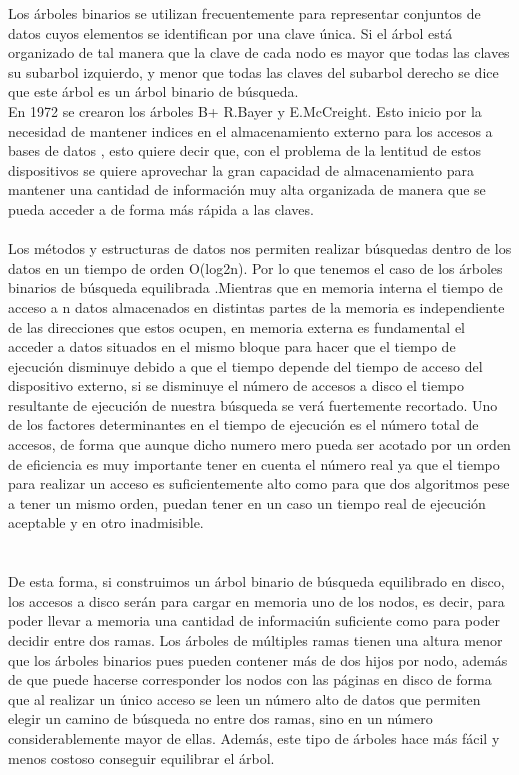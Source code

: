 \documentclass[11pt,a4paper]{report}
\begin{document}
Los \'arboles binarios se utilizan frecuentemente para representar conjuntos de datos cuyos elementos se identifican por una clave \'unica. Si el \'arbol est\'a organizado de tal manera que la clave de cada nodo es mayor que todas las claves su subarbol izquierdo, y menor que todas las claves del subarbol derecho se dice que este \'arbol es un \'arbol binario de b\'usqueda.
\\

En 1972 se crearon los \'arboles B+ R.Bayer y E.McCreight.  Esto inicio por la necesidad de mantener indices en el almacenamiento externo para los accesos a bases de datos , esto quiere decir que, con el  problema de la lentitud  de estos dispositivos se quiere aprovechar la gran capacidad de almacenamiento para mantener una cantidad de informaci\'on muy alta organizada de manera que se pueda acceder a de forma m\'as r\'apida a las claves.
\\
\\
Los m\'etodos y estructuras de datos nos permiten realizar b\'usquedas dentro de los datos en un tiempo de orden O(log2n). Por lo que  tenemos el caso de los \'arboles binarios de b\'usqueda equilibrada .Mientras que en memoria interna el tiempo de acceso a n datos almacenados  en distintas partes de la memoria es independiente de las direcciones que estos ocupen, en memoria externa es fundamental el acceder a datos situados en el mismo bloque para hacer que el tiempo de ejecuci\'on disminuye debido a que el tiempo depende del tiempo de acceso del dispositivo externo, si se disminuye  el n\'umero de accesos a disco el tiempo resultante de ejecuci\'on de nuestra b\'usqueda se ver\'a fuertemente recortado. Uno de los factores determinantes en el tiempo de ejecuci\'on es el n\'umero total de accesos, de forma que aunque dicho numero mero pueda ser acotado por un orden de eficiencia es muy importante tener en cuenta el n\'umero real ya que el tiempo para realizar un acceso es suficientemente alto como para que dos algoritmos pese a tener un mismo orden, puedan tener en un caso un tiempo real de ejecuci\'on aceptable y en otro inadmisible.
\\
\\
\\
De esta forma, si construimos un \'arbol binario de b\'usqueda equilibrado en disco, los accesos a disco ser\'an para cargar en memoria uno de los nodos, es decir,  para poder llevar a memoria una cantidad de informaci\'un suficiente como para poder decidir entre dos ramas. Los \'arboles de m\'ultiples ramas tienen una altura menor que los \'arboles binarios pues pueden contener m\'as de dos hijos por nodo, adem\'as de que puede hacerse corresponder los nodos con las p\'aginas en disco de forma que al realizar un \'unico acceso se leen un n\'umero alto de datos que permiten elegir un camino de b\'usqueda no entre dos ramas, sino en un n\'umero considerablemente mayor de ellas. Adem\'as, este tipo de \'arboles hace m\'as f\'acil y menos costoso conseguir equilibrar el \'arbol.
\\
\\
\\
\end{document}
